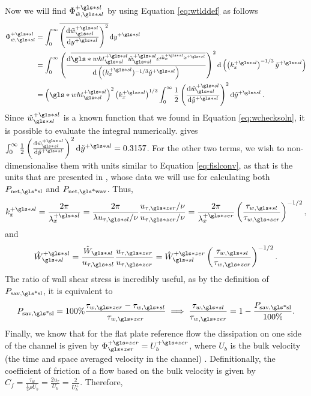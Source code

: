 Now we will find $\Phi _{\tilde{w},\gls*{sl}}\ps$ by using Equation \eqref{eq:wtlddef} as follows
\begin{align}
	\Phi _{\tilde{w},\gls*{sl}}\ps &= \int_{0}^{\infty} \overline{\left( \dv{\tilde{w}\ssl\ps}{y\ps}  \right) ^2} \dd{y\ps}   \\
				       &= \int_{0}^{\infty} \left( \dv{\overline{\gls*{wht}\ps\ssl\check{w}\ssl\ps e^{ik\ps_x x\ps}}}{\left((k_x\ps)^{-1 /3}\check{y}\ps\right)}  \right) ^2 \dd{\left(\left(k_x\ps\right)^{-1 /3}\check{y}\ps\right)}   \\
				       &= \left(\gls*{wht}\ps\ssl\right)^2\left(k_x\ps\right)^{1 /3}\int_{0}^{\infty}\frac{1}{2} \left( \dv{\check{w}\ssl\ps}{\check{y}\ps}  \right) ^2 \dd{\check{y}\ps} \label{eq:fislps}
.\end{align}
Since $\check{w}\ssl\ps$ is a known function that we found in Equation \eqref{eq:wchecksoln}, it is possible to evaluate the integral numerically. \textcite{chernyshenko2013} gives $\int_{0}^{\infty}  \frac{1}{2} \left( \dv{\check{w}\ssl\ps}{\check{y}\ps}  \right) ^2 \dd{\check{y}\ps} = 0.3157$. For the other two terms, we wish to non-dimensionalise them with \pz units similar to Equation \eqref{eq:fislconv}, as that is the units that are presented in \textcite{viotti2009}, whose data we will use for calculating both $P_\text{net,\gls*{sl}} $ and $P_\text{net,\gls*{wav}} $. Thus,
\begin{equation}
	k_x\ps=\frac{2\pi}{\lambda_x\ps}=\frac{2\pi}{\lambda u_{\tau,\gls*{sl}}/\nu}\frac{u_{\tau,\gls*{zer}}/\nu}{u_{\tau,\gls*{zer}}/\nu}=\frac{2\pi}{\lambda_x\pz}\left( \frac{\tau_{w,\gls*{sl}}}{\tau_{w,\gls*{zer}}} \right) ^{-1 /2}\label{eq:kxslconv}
,\end{equation}
and
\begin{equation}
	\hat{W}\ps\ssl=\frac{\hat{W}\ssl}{u_{\tau,\gls*{sl}}}\frac{u_{\tau,\gls*{zer}}}{u_{\tau,\gls*{zer}}}=\hat{W}\ssl\pz\left( \frac{\tau_{w,\gls*{sl}}}{\tau_{w,\gls*{zer}}} \right) ^{-1 /2}\label{eq:whtslconv}
.\end{equation}
The ratio of wall shear stress is incredibly useful, as by the definition of $P_\text{sav,\gls*{sl}} $, it is equivalent to
\begin{equation}
	P_\text{sav,\gls*{sl}}=100\%\frac{\tau_{w,\gls*{zer}}-\tau_{w,\gls*{sl}}}{\tau_{w,\gls*{zer}}}\implies \frac{\tau_{w,\gls*{sl}}}{\tau_{w,\gls*{zer}}}= 1-\frac{ P_\text{sav,\gls*{sl}} }{100\%} \label{eq:taupsavconv}
.\end{equation}
Finally, we know that for the flat plate reference flow the dissipation on one side of the channel is given by	$\Phi \pz\zz = U_b\pz$, where $U_b$ is the bulk velocity (the time and space averaged velocity in the channel) \cite{chernyshenko2013}. Definitionally, the coefficient of friction of a flow based on the bulk velocity is given by $C_f=\frac{\tau_w}{\frac{1}{2}\rho U_b}=\frac{2u_{\tau}}{U_b}=\frac{2}{U_b^{+}}$. Therefore,
